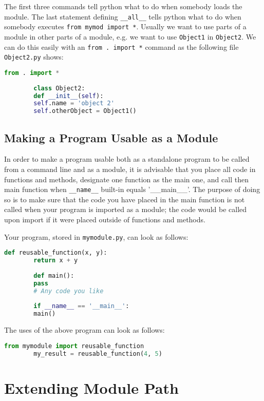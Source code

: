 \documentclass{article}
\begin{document}
	The first three commands tell python what to do when somebody loads the module. The last statement defining \texttt{\_\_all\_\_} tells python what to do when somebody executes \texttt{from mymod import *}. Usually we want to use parts of a module in other parts of a module, e.g. we want to use \texttt{Object1} in \texttt{Object2}. We can do this easily with an \texttt{from . import *} command as the following file \texttt{Object2.py} shows:
	
	\begin{lstlisting}[language=Python]
		from . import *
		
		class Object2:
		def __init__(self):
		self.name = 'object 2'
		self.otherObject = Object1()
	\end{lstlisting}
	
	\subsection{Making a Program Usable as a Module}
	
	In order to make a program usable both as a standalone program to be called from a command line and as a module, it is advisable that you place all code in functions and methods, designate one function as the main one, and call then main function when \texttt{\_\_name\_\_} built-in equals '\_\_main\_\_'. The purpose of doing so is to make sure that the code you have placed in the main function is not called when your program is imported as a module; the code would be called upon import if it were placed outside of functions and methods.
	
	Your program, stored in \texttt{mymodule.py}, can look as follows:
	
	\begin{lstlisting}[language=Python]
		def reusable_function(x, y):
		return x + y
		
		def main():
		pass
		# Any code you like
		
		if __name__ == '__main__':
		main()
	\end{lstlisting}
	
	The uses of the above program can look as follows:
	
	\begin{lstlisting}[language=Python]
		from mymodule import reusable_function
		my_result = reusable_function(4, 5)
	\end{lstlisting}
	
	\section{Extending Module Path}
	
\end{document}
